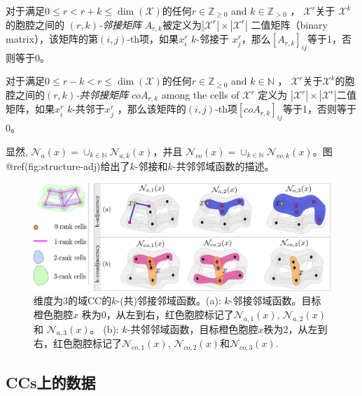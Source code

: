 \documentclass[
  12pt,
]{krantz}
\begin{document}
\label{adj-mat}
对于满足\(0\leq r<r+k \leq \dim(\mathcal{X})\)的任何\(r\in\mathbb{Z}_{\ge 0}\)
and \(k\in \mathbb{Z}_{>0}\) ， \(\mathcal{X}^{r}\)关于
\(\mathcal{X}^{k}\)的胞腔之间的 \emph{\((r,k)\)-邻接矩阵}
\(A_{r,k}\)被定义为\(|\mathcal{X}^r| \times |\mathcal{X}^r|\)
二值矩阵（binary matrix），该矩阵的第\((i, j)\)-th项，如果\(x^r_i\)
\(k\)-邻接于 \(x^r_j\)，那么\([A_{r,k}]_{ij}\)等于1，否则等于0。

\label{coadj-mat}
对于满足\(0\leq r-k<r \leq \dim(\mathcal{X})\)的任何\(r\in \mathbb{Z}_{\ge 0}\)
and \(k\in\mathbb{N}\) ，
\(\mathcal{X}^{r}\)关于\(\mathcal{X}^{k}\)的胞腔之间的\emph{\((r,k)\)-共邻接矩阵}
\(coA_{r,k}\) among the cells of \(\mathcal{X}^{r}\) 定义为
\(|\mathcal{X}^r| \times |\mathcal{X}^r|\)二值矩阵，如果\(x^r_i\)
\(k\)-共邻于\(x^r_j\)
，那么该矩阵的\((i, j)\)-th项\([coA_{r,k}]_{ij}\)等于1，否则等于0。

显然,
\(\mathcal{N}_{a}(x)= \cup_{k\in\mathbb{N}} \mathcal{N}_{a,k}(x)\)，并且
\(\mathcal{N}_{co}(x)= \cup_{k\in\mathbb{N}} \mathcal{N}_{co,k}(x)\)。图@ref(fig:structure-adj)给出了\(k\)-邻接和\(k\)-共邻邻域函数的描述。

\begin{figure}

{\centering \includegraphics{figures/structure_adj} 

}

\caption{维度为3的域CC的$k$-(共)邻接邻域函数。(a): $k$-邻接邻域函数。目标橙色胞腔$x$ 秩为0，从左到右，红色胞腔标记了$\mathcal{N}_{a,1}(x)$, $\mathcal{N}_{a,2}(x)$ 和 $\mathcal{N}_{a,3}(x)$。 (b): $k$-共邻邻域函数，目标橙色胞腔$x$秩为2，从左到右，红色胞腔标记了$\mathcal{N}_{co,1}(x)$, $\mathcal{N}_{co,2}(x)$和$\mathcal{N}_{co,3}(x)$.}\label{fig:structure-adj}
\end{figure}

\subsection{CCs上的数据}\label{data-on-ccs}
\end{document}
